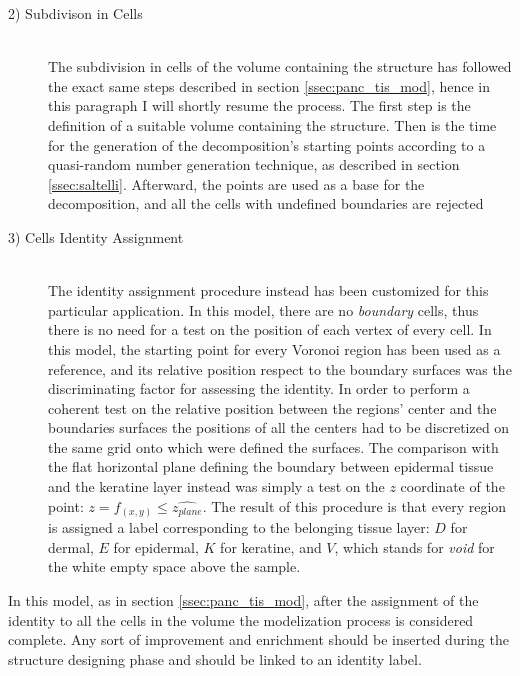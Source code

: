 \begin{description}
    \item [2) Subdivison in Cells] \hfill \\
    The subdivision in cells of the volume containing the structure has followed the exact same steps described in section \ref{ssec:panc_tis_mod}, hence in this paragraph I will shortly resume the process. The first step is the definition of a suitable volume containing the structure. Then is the time for the generation of the decomposition's starting points according to a quasi-random number generation technique, as described in section \ref{ssec:saltelli}. Afterward, the points are used as a base for the decomposition, and all the cells with undefined boundaries are rejected

    \item [3) Cells Identity Assignment] \hfill \\
    The identity assignment procedure instead has been customized for this particular application. In this model, there are no \textit{boundary} cells, thus there is no need for a test on the position of each vertex of every cell. In this model, the starting point for every Voronoi region has been used as a reference, and its relative position respect to the boundary surfaces was the discriminating factor for assessing the identity. In order to perform a coherent test on the relative position between the regions' center and the boundaries surfaces the positions of all the centers had to be discretized on the same grid onto which were defined the surfaces. The comparison with the flat horizontal plane defining the boundary between epidermal tissue and the keratine layer instead was simply a test on the $z$ coordinate of the point: $z = f_{(x,y)} \leq \hat{z_{plane}}$. The result of this procedure is that every region is assigned a label corresponding to the belonging tissue layer: $D$ for dermal, $E$ for epidermal, $K$ for keratine, and $V$, which stands for \textit{void} for the white empty space above the sample.

\end{description}

In this model, as in section \ref{ssec:panc_tis_mod}, after the assignment of the identity to all the cells in the volume the modelization process is considered complete. Any sort of improvement and enrichment should be inserted during the structure designing phase and should be linked to an identity label.
